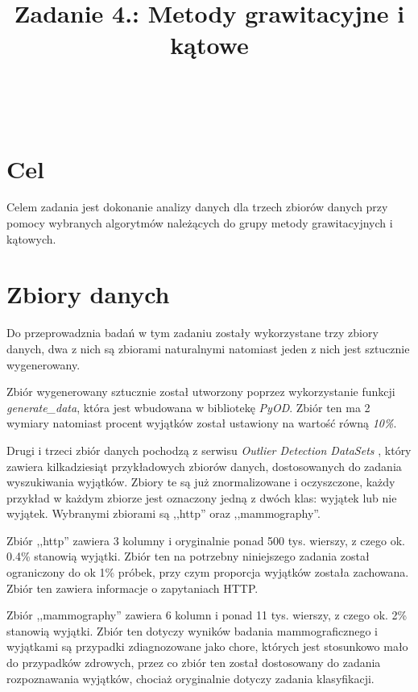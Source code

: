 \documentclass{classrep}
\author{%
    \studentinfo[239671@edu.p.lodz.pl]{Jan Karwowski}{239671}\\
    \studentinfo[239676@edu.p.lodz.pl]{Kamil Kowalewski}{239676}\\
}
\title{Zadanie 4.: Metody grawitacyjne i kątowe}
\begin{document}
    \maketitle
    \thispagestyle{fancyplain}

    \tableofcontents
    \newpage

    \section{Cel} {
        Celem zadania jest dokonanie analizy danych dla trzech zbiorów danych przy
        pomocy wybranych algorytmów należących do grupy metody grawitacyjnych i kątowych.
    }

    \section{Zbiory danych} {
        Do przeprowadznia badań w tym zadaniu zostały wykorzystane trzy zbiory danych,
        dwa z nich są zbiorami naturalnymi natomiast jeden z nich jest sztucznie
        wygenerowany.

        Zbiór wygenerowany sztucznie został utworzony poprzez wykorzystanie funkcji
        \textit{generate\_data}, która jest wbudowana w bibliotekę
        \textit{PyOD}\cite{pyod}. Zbiór ten ma 2 wymiary natomiast procent wyjątków
        został ustawiony na wartość równą \textit{10\%}.

        Drugi i trzeci zbiór danych pochodzą z serwisu \emph{Outlier Detection DataSets}
        \cite{odds}, który zawiera kilkadziesiąt przykładowych zbiorów
        danych, dostosowanych do zadania wyszukiwania wyjątków. Zbiory te są już
        znormalizowane i oczyszczone, każdy przykład w każdym zbiorze jest oznaczony
        jedną z dwóch klas: wyjątek lub nie wyjątek. Wybranymi zbiorami są ,,http''
        oraz ,,mammography''.

        Zbiór ,,http'' zawiera 3 kolumny i oryginalnie ponad 500 tys. wierszy, z czego
        ok. 0.4\% stanowią wyjątki. Zbiór ten na potrzebny niniejszego zadania został
        ograniczony do ok 1\% próbek, przy czym proporcja wyjątków została zachowana.
        Zbiór ten zawiera informacje o zapytaniach HTTP.

        Zbiór ,,mammography'' zawiera 6 kolumn i ponad 11 tys. wierszy, z czego ok. 2\%
        stanowią wyjątki. Zbiór ten dotyczy wyników badania mammograficznego i
        wyjątkami są przypadki zdiagnozowane jako chore, których jest stosunkowo mało
        do przypadków zdrowych, przez co zbiór ten został dostosowany do zadania
        rozpoznawania wyjątków, chociaż oryginalnie dotyczy zadania klasyfikacji.
    }
\end{document}
